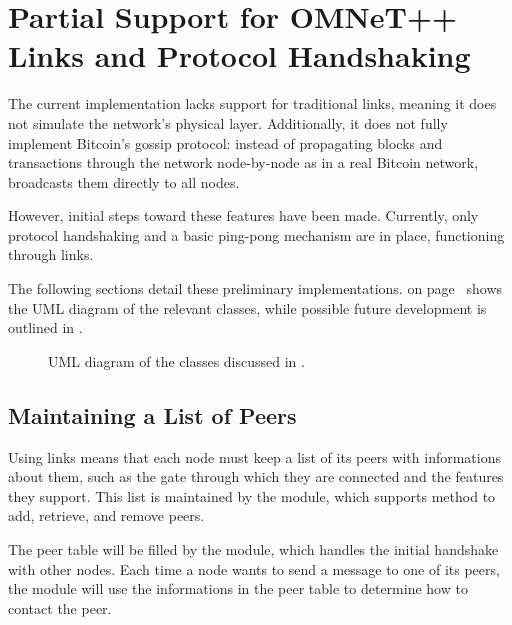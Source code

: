 \section{Partial Support for OMNeT++ Links and Protocol
Handshaking}\label{sec:partial-work}

The current \iblock{} implementation lacks support for traditional \omnetpp{}
links, meaning it does not simulate the network's physical layer. Additionally,
it does not fully implement Bitcoin's gossip protocol: instead of propagating
blocks and transactions through the network node-by-node as in a real Bitcoin
network, \iblock{} broadcasts them directly to all nodes.

However, initial steps toward these features have been made. Currently, only
protocol handshaking and a basic ping-pong mechanism are in place, functioning
through \omnetpp{} links.

The following sections detail these preliminary implementations.
 on page~\pageref{fig:next-uml} shows the UML diagram of
the relevant classes, while possible future development is outlined in
.

\begin{figure*}
	\centering
\end{figure*}

\begin{figure*}
	\ContinuedFloat
	\centering
	\caption{UML diagram of the classes discussed in
	.}\label{fig:next-uml}
\end{figure*}

\subsection{Maintaining a List of Peers}\label{subsec:peers-list}

Using \omnetpp{} links means that each node must keep a list of its peers with
informations about them, such as the gate through which they are connected and
the features they support. This list is maintained by the 
module, which supports method to add, retrieve, and remove peers.

The peer table will be filled by the  module, which
handles the initial handshake with other nodes. Each time a node wants to send
a message to one of its peers, the  module will use the
informations in the peer table to determine how to contact the peer.

